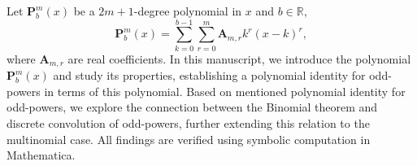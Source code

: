 Let $\mathbf{P}^{m}_{b}(x)$ be a $2m+1$-degree polynomial in $x$ and $b \in \mathbb{R}$,
\[
    \mathbf{P}^{m}_{b}(x) = \sum_{k=0}^{b-1} \sum_{r=0}^{m} \mathbf{A}_{m,r} k^r (x-k)^r,
\]
where $\mathbf{A}_{m,r}$ are real coefficients.
In this manuscript, we introduce the polynomial $\mathbf{P}^{m}_{b}(x)$ and study its properties,
establishing a polynomial identity for odd-powers in terms of this polynomial.
Based on mentioned polynomial identity for odd-powers,
we explore the connection between the Binomial theorem and discrete convolution of odd-powers,
further extending this relation to the multinomial case.
All findings are verified using symbolic computation in Mathematica.
